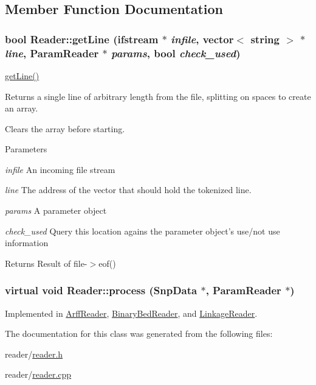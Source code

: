 \subsection{Member Function Documentation}
\hypertarget{classReader_af1812be4a38c094fd2a34a13b784e554}{
\subsubsection[{getLine}]{\setlength{\rightskip}{0pt plus 5cm}bool Reader::getLine (ifstream $\ast$ {\em infile}, \/  vector$<$ string $>$ $\ast$ {\em line}, \/  {\bf ParamReader} $\ast$ {\em params}, \/  bool {\em check\_\-used})}}
\label{classReader_af1812be4a38c094fd2a34a13b784e554}
\hyperlink{classReader_af1812be4a38c094fd2a34a13b784e554}{getLine()}

Returns a single line of arbitrary length from the file, splitting on spaces to create an array.

Clears the array before starting.


\begin{DoxyParams}{Parameters}
\item[{\em infile}]An incoming file stream \item[{\em line}]The address of the vector that should hold the tokenized line. \item[{\em params}]A parameter object \item[{\em check\_\-used}]Query this location agains the parameter object's use/not use information \end{DoxyParams}
\begin{DoxyReturn}{Returns}
Result of file-\/$>$eof() 
\end{DoxyReturn}
\hypertarget{classReader_a334a724f607c84262af67759ffcdbd26}{
\subsubsection[{process}]{\setlength{\rightskip}{0pt plus 5cm}virtual void Reader::process ({\bf SnpData} $\ast$, \/  {\bf ParamReader} $\ast$)}}
\label{classReader_a334a724f607c84262af67759ffcdbd26}


Implemented in \hyperlink{classArffReader_af12ed42f6e726a6e336f22381ca84082}{ArffReader}, \hyperlink{classBinaryBedReader_a2132af8b71a683550c19ec4ac3ec3db2}{BinaryBedReader}, and \hyperlink{classLinkageReader_a808d3be4b0a2b3af8a7ec7fea963960b}{LinkageReader}.



The documentation for this class was generated from the following files:\begin{DoxyCompactItemize}
\item 
reader/\hyperlink{reader_8h}{reader.h}\item 
reader/\hyperlink{reader_8cpp}{reader.cpp}\end{DoxyCompactItemize}
